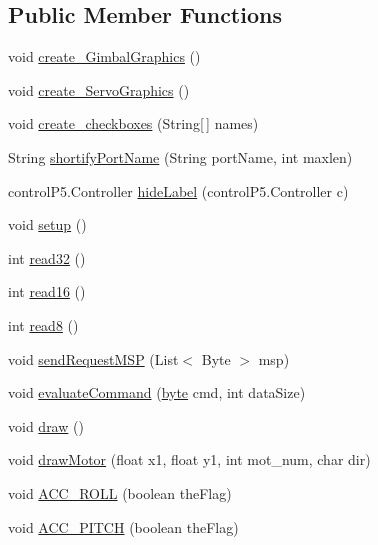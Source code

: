 \subsection*{Public Member Functions}
\begin{DoxyCompactItemize}
\item 
void \hyperlink{classMultiWiiConf_a258e9697d588ea99af87ec28247e4e16}{create\-\_\-\-Gimbal\-Graphics} ()
\item 
void \hyperlink{classMultiWiiConf_a588a52b9b9194d6b7f62662474d57c55}{create\-\_\-\-Servo\-Graphics} ()
\item 
void \hyperlink{classMultiWiiConf_a926ade417ce21f3326c93f8bd1348c77}{create\-\_\-checkboxes} (String\mbox{[}$\,$\mbox{]} names)
\item 
String \hyperlink{classMultiWiiConf_a1c2dc8d157b78a114b18efce73a082c3}{shortify\-Port\-Name} (String port\-Name, int maxlen)
\item 
control\-P5.\-Controller \hyperlink{classMultiWiiConf_a035c449396cb5812f5af4bf9e9c88cfc}{hide\-Label} (control\-P5.\-Controller c)
\item 
void \hyperlink{classMultiWiiConf_a8b52584570b1367ee4ce93e112fbd0ca}{setup} ()
\item 
int \hyperlink{classMultiWiiConf_aab7fc403f177393a58e0006fd38882cb}{read32} ()
\item 
int \hyperlink{classMultiWiiConf_a013c041b164d4a46b4c3444a8ba21cc1}{read16} ()
\item 
int \hyperlink{classMultiWiiConf_aeefc4968d2588d9158941d340486e993}{read8} ()
\item 
void \hyperlink{classMultiWiiConf_aa113c0a77055b4b010b2c4033e510f8e}{send\-Request\-M\-S\-P} (List$<$ Byte $>$ msp)
\item 
void \hyperlink{classMultiWiiConf_ad8ccf8a1d553340481337ca747754a13}{evaluate\-Command} (\hyperlink{Arduino_8h_ab8ef12fab634c171394422d0ee8baf94}{byte} cmd, int data\-Size)
\item 
void \hyperlink{classMultiWiiConf_a94c00cd9bbdb03acbe78a3bde4141cea}{draw} ()
\item 
void \hyperlink{classMultiWiiConf_a2fc869dfda4cb57606fee25d1e3c8c78}{draw\-Motor} (float x1, float y1, int mot\-\_\-num, char dir)
\item 
void \hyperlink{classMultiWiiConf_adbfd907cb05cd32e61f5ac383baddbcd}{A\-C\-C\-\_\-\-R\-O\-L\-L} (boolean the\-Flag)
\item 
void \hyperlink{classMultiWiiConf_aa7c58b0a234c718599c60146e11aeaa2}{A\-C\-C\-\_\-\-P\-I\-T\-C\-H} (boolean the\-Flag)

\end{DoxyCompactItemize}
